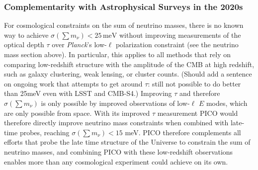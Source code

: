 \documentclass[PICOReport.tex]{subfiles}
\begin{document}

\subsubsection{Complementarity with Astrophysical Surveys in the 2020s}

For cosmological constraints on the sum of neutrino masses, there is no known way to achieve $\sigma(\sum m_\nu)<25\,\mathrm{meV}$ without improving measurements of the optical depth $\tau$ over {\it Planck}'s low-$\ell$ polarization constraint (see the neutrino mass section above). In particular, this applies to all methods that rely on comparing low-redshift structure with the amplitude of the CMB at high redshift, such as galaxy clustering, weak lensing, or cluster counts. (Should add a sentence on ongoing work that attempts to get around $\tau$: still not possible to do better than 25meV even with LSST and CMB-S4.) Improving $\tau$ and therefore $\sigma(\sum m_\nu)$ is only possible by improved observations of low-$\ell$ $E$ modes, which are only possible from space. With its improved $\tau$ measurement PICO would therefore directly improve neutrino mass constraints when combined with late-time probes, reaching $\sigma(\sum m_\nu)<15$ meV.  PICO therefore complements all efforts that probe the late time structure of the Universe to constrain the sum of neutrino masses, and combining PICO with these low-redshift observations enables more than any cosmological experiment could achieve on its own.
 
\end{document}
